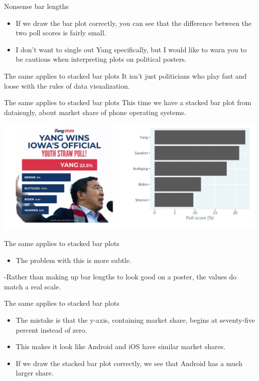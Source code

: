\documentclass[
  ignorenonframetext,
]{beamer}
\providecommand{\tightlist}{%
  \setlength{\itemsep}{0pt}\setlength{\parskip}{0pt}}
\begin{document}
\begin{frame}{Nonsense bar lengths}
\label{nonsense-bar-lengths-2}
\begin{itemize}
\item
  If we draw the bar plot correctly, you can see that the difference
  between the two poll scores is fairly small.
\item
  I don't want to single out Yang specifically, but I would like to warn
  you to be cautious when interpreting plots on political posters.
\end{itemize}
\end{frame}

\begin{frame}{The same applies to stacked bar plots}
\label{the-same-applies-to-stacked-bar-plots}
It isn't just politicians who play fast and loose with the rules of data
visualization.
\end{frame}

\begin{frame}{The same applies to stacked bar plots}
\label{the-same-applies-to-stacked-bar-plots-1}
This time we have a stacked bar plot from dataisugly, about market share
of phone operating systems.

\includegraphics{../images/im108.png}
\end{frame}

\begin{frame}{The same applies to stacked bar plots}
\label{the-same-applies-to-stacked-bar-plots-2}
\begin{itemize}
\tightlist
\item
  The problem with this is more subtle.
\end{itemize}

-Rather than making up bar lengths to look good on a poster, the values
do match a real scale.
\end{frame}

\begin{frame}{The same applies to stacked bar plots}
\label{the-same-applies-to-stacked-bar-plots-3}
\begin{itemize}
\item
  The mistake is that the y-axis, containing market share, begins at
  seventy-five percent instead of zero.
\item
  This makes it look like Android and iOS have similar market shares.
\item
  If we draw the stacked bar plot correctly, we see that Android has a
  much larger share.
\end{itemize}
\end{frame}
\end{document}
